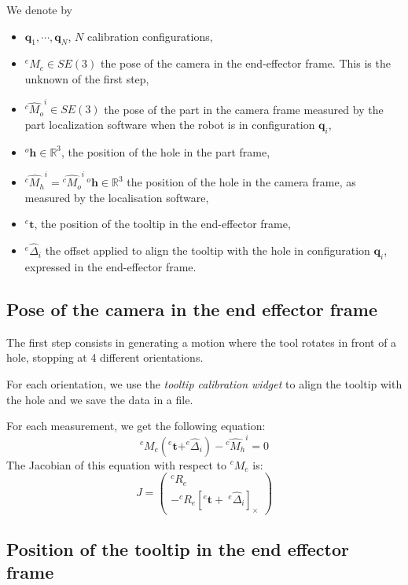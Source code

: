 \documentclass {article}
\newcommand\conf{\mathbf{q}}
\newcommand\transf[2]{^{#1}M_{#2}}
\newcommand\linvel{\mathbf{v}}
\newcommand\angvel{\omega}
\newcommand\cross[1]{\left[#1\right]_{\times}}
\newcommand\hole{\mathbf{h}}
\newcommand\tool{\mathbf{t}}
\newcommand{\reals}{\mathbb{R}}
\begin{document}
We denote by
\begin{itemize}
\item $\conf_1,\cdots,\conf_N$, $N$ calibration configurations,
\item $\transf{e}{c}\in SE(3)$ the pose of the camera in the end-effector frame. This
  is the unknown of the first step,
\item $\hat{\transf{c}{o}}^i\in SE(3)$ the pose of the part in the camera frame measured by the part localization software when the robot is in configuration $\conf_i$,
\item $^{o}\hole\in\reals^3$, the position of the hole in the part frame,
\item $\hat{\transf{c}{h}}^i = \hat{\transf{c}{o}}^i\, ^{o}\hole\in\reals^3$ the position of the hole in the camera frame, as measured by the localisation software,
\item $^{e}\tool$, the position of the tooltip in the end-effector frame,
\item $^{e}\hat{\Delta}_i$ the offset applied to align the tooltip with the hole in configuration $\conf_i$, expressed in the end-effector frame.
\end{itemize}

\subsection{Pose of the camera in the end effector frame}

The first step consists in generating a motion where the tool rotates in front
of a hole, stopping at 4 different orientations.

For each orientation, we use the \textit{tooltip calibration widget} to align
the tooltip with the hole and we save the data in a file.

For each measurement, we get the following equation:
$$
\transf{c}{e}(^e\tool + ^{e}\hat{\Delta}_i) - \hat{\transf{c}{h}}^i = 0
$$
The Jacobian of this equation with respect to $\transf{c}{e}$ is:
$$
J = \left(\begin{array}{c} ^{c}R_{e} \\ -^{c}R_{e}\cross{^e\tool +\ ^{e}\hat{\Delta}_i}\end{array}\right)
$$
\subsection{Position of the tooltip in the end effector frame}
\end{document}
